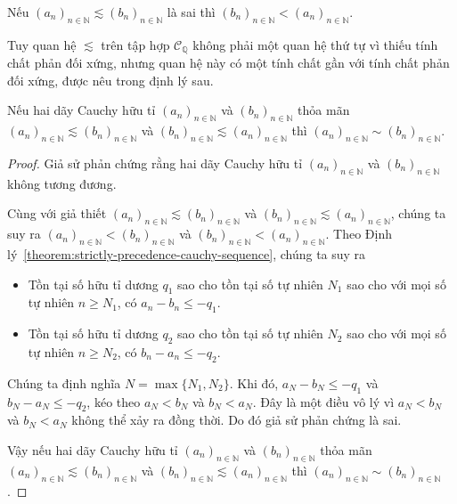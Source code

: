 \begin{corollary}
    Nếu ${(a_{n})}_{n\in\mathbb{N}}\lesssim {(b_{n})}_{n\in\mathbb{N}}$ là sai thì ${(b_{n})}_{n\in\mathbb{N}} < {(a_{n})}_{n\in\mathbb{N}}$.
\end{corollary}

Tuy quan hệ $\lesssim$ trên tập hợp $\mathscr{C}_{\mathbb{Q}}$ không phải một quan hệ thứ tự vì thiếu tính chất phản đối xứng, nhưng quan hệ này có một tính chất gần với tính chất phản đối xứng, được nêu trong định lý sau.

\begin{theorem}\label{theorem:cauchy-sequences-pre-antisymmetric}
    Nếu hai dãy Cauchy hữu tỉ ${(a_{n})}_{n\in\mathbb{N}}$ và ${(b_{n})}_{n\in\mathbb{N}}$ thỏa mãn ${(a_{n})}_{n\in\mathbb{N}}\lesssim {(b_{n})}_{n\in\mathbb{N}}$ và ${(b_{n})}_{n\in\mathbb{N}}\lesssim {(a_{n})}_{n\in\mathbb{N}}$ thì ${(a_{n})}_{n\in\mathbb{N}}\sim {(b_{n})}_{n\in\mathbb{N}}$.
\end{theorem}

\begin{proof}
    Giả sử phản chứng rằng hai dãy Cauchy hữu tỉ ${(a_{n})}_{n\in\mathbb{N}}$ và ${(b_{n})}_{n\in\mathbb{N}}$ không tương đương.

    Cùng với giả thiết ${(a_{n})}_{n\in\mathbb{N}}\lesssim {(b_{n})}_{n\in\mathbb{N}}$ và ${(b_{n})}_{n\in\mathbb{N}}\lesssim {(a_{n})}_{n\in\mathbb{N}}$, chúng ta suy ra  ${(a_{n})}_{n\in\mathbb{N}} < {(b_{n})}_{n\in\mathbb{N}}$ và ${(b_{n})}_{n\in\mathbb{N}} < {(a_{n})}_{n\in\mathbb{N}}$. Theo Định lý~\ref{theorem:strictly-precedence-cauchy-sequence}, chúng ta suy ra
    \begin{itemize}
        \item Tồn tại số hữu tỉ dương $q_{1}$ sao cho tồn tại số tự nhiên $N_{1}$ sao cho với mọi số tự nhiên $n\geq N_{1}$, có $a_{n} - b_{n}\leq -q_{1}$.
        \item Tồn tại số hữu tỉ dương $q_{2}$ sao cho tồn tại số tự nhiên $N_{2}$ sao cho với mọi số tự nhiên $n\geq N_{2}$, có $b_{n} - a_{n}\leq -q_{2}$.
    \end{itemize}

    Chúng ta định nghĩa $N = \max\{ N_{1}, N_{2} \}$. Khi đó, $a_{N} - b_{N}\leq -q_{1}$ và $b_{N} - a_{N}\leq -q_{2}$, kéo theo $a_{N} < b_{N}$ và $b_{N} < a_{N}$. Đây là một điều vô lý vì $a_{N} < b_{N}$ và $b_{N} < a_{N}$ không thể xảy ra đồng thời. Do đó giả sử phản chứng là sai.

    Vậy nếu hai dãy Cauchy hữu tỉ ${(a_{n})}_{n\in\mathbb{N}}$ và ${(b_{n})}_{n\in\mathbb{N}}$ thỏa mãn ${(a_{n})}_{n\in\mathbb{N}}\lesssim {(b_{n})}_{n\in\mathbb{N}}$ và ${(b_{n})}_{n\in\mathbb{N}}\lesssim {(a_{n})}_{n\in\mathbb{N}}$ thì ${(a_{n})}_{n\in\mathbb{N}}\sim {(b_{n})}_{n\in\mathbb{N}}$.
\end{proof}

